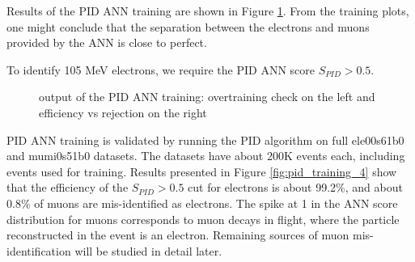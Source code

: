 Results of the PID ANN training are shown in Figure \ref{fig:pid_training_3}. 
From the training plots, one might conclude that the separation between the
electrons and muons provided by the ANN is close to perfect. 

To identify 105 MeV electrons, we require the PID ANN score $S_{PID} > 0.5$.

\begin{figure}[H]
\hspace{-0.6in}
  \caption{
    \label{fig:pid_training_3}
    output of the PID ANN training: overtraining check on the left and efficiency vs rejection 
    on the right
  }
\end{figure}

PID ANN training is validated by running the PID algorithm on full ele00s61b0 and mumi0s51b0 datasets.
The datasets have about 200K events each, including events used for training. 
Results presented in Figure \ref{fig:pid_training_4} show that the efficiency of the $S_{PID} > 0.5$ cut 
for electrons is about 99.2\%, and about 0.8\% of muons are mis-identified as electrons. The spike at 1
in the ANN score distribution for muons corresponds to muon decays in flight, where the particle
reconstructed in the event is an electron. Remaining sources of muon mis-identification will be 
studied in detail later.

